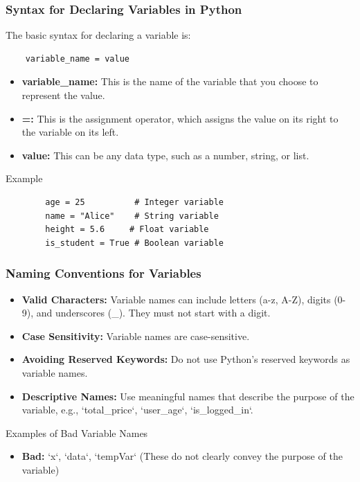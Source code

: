 \documentclass{beamer}
\begin{document}
\begin{frame}[fragile]
    \frametitle{Syntax for Declaring Variables in Python}
    The basic syntax for declaring a variable is:
    \begin{lstlisting}
    variable_name = value
    \end{lstlisting}
    \begin{itemize}
        \item \textbf{variable\_name:} This is the name of the variable that you choose to represent the value.
        \item \textbf{=:} This is the assignment operator, which assigns the value on its right to the variable on its left.
        \item \textbf{value:} This can be any data type, such as a number, string, or list.
    \end{itemize}
    \begin{block}{Example}
        \begin{lstlisting}
        age = 25          # Integer variable
        name = "Alice"    # String variable
        height = 5.6     # Float variable
        is_student = True # Boolean variable
        \end{lstlisting}
    \end{block}
\end{frame}

\begin{frame}[fragile]
    \frametitle{Naming Conventions for Variables}
    \begin{itemize}
        \item \textbf{Valid Characters:} Variable names can include letters (a-z, A-Z), digits (0-9), and underscores (\_). They must not start with a digit.
        \item \textbf{Case Sensitivity:} Variable names are case-sensitive.
        \item \textbf{Avoiding Reserved Keywords:} Do not use Python’s reserved keywords as variable names.
        \item \textbf{Descriptive Names:} Use meaningful names that describe the purpose of the variable, e.g., `total_price`, `user_age`, `is_logged_in`.
    \end{itemize}
    \begin{block}{Examples of Bad Variable Names}
        \begin{itemize}
            \item \textbf{Bad:} `x`, `data`, `tempVar` (These do not clearly convey the purpose of the variable)
        \end{itemize}
    \end{block}
\end{frame}
\end{document}
